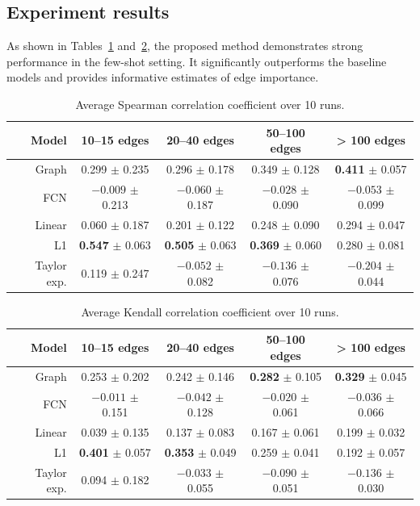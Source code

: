 \subsection{Experiment results}

As shown in Tables~\ref{results_spearman} and~\ref{results_kendall}, the proposed method demonstrates strong performance in the few-shot setting. 
It significantly outperforms the baseline models and provides informative estimates of edge importance.

\begin{table}[H]
\caption{Average Spearman correlation coefficient over 10 runs.}
\label{results_spearman}
\centering
\begin{tabular}{|r|c|c|c|c|}
\hline
\bfseries Model & 10--15 edges & 20--40 edges & 50--100 edges & > 100 edges \\
\hline
Graph  & 0.299 $\pm$ 0.235 & 0.296 $\pm$ 0.178 & 0.349 $\pm$ 0.128 & \textbf{0.411} $\pm$ 0.057 \\
FCN & $-0.009$ $\pm$ 0.213 & $-0.060$ $\pm$ 0.187 & $-0.028$ $\pm$ 0.090 & $-0.053$ $\pm$ 0.099 \\
Linear & 0.060 $\pm$ 0.187 & 0.201 $\pm$ 0.122 & 0.248 $\pm$ 0.090 & 0.294 $\pm$ 0.047 \\
L1 & \textbf{0.547} $\pm$ 0.063 & \textbf{0.505} $\pm$ 0.063 & \textbf{0.369} $\pm$ 0.060 & 0.280 $\pm$ 0.081 \\
Taylor exp.& 0.119 $\pm$ 0.247 & $-0.052$ $\pm$ 0.082 & $-0.136$ $\pm$ 0.076 & $-0.204$ $\pm$ 0.044 \\
\hline
\end{tabular}
\end{table}

\begin{table}[H]
\caption{Average Kendall correlation coefficient over 10 runs.}
\label{results_kendall}
\centering
\begin{tabular}{|r|c|c|c|c|}
\hline
\bfseries Model & 10--15 edges & 20--40 edges & 50--100 edges & > 100 edges \\
\hline
Graph  & 0.253 $\pm$ 0.202 & 0.242 $\pm$ 0.146 & \textbf{0.282} $\pm$ 0.105 & \textbf{0.329} $\pm$ 0.045 \\
FCN & $-0.011$ $\pm$ 0.151 & $-0.042$ $\pm$ 0.128 & $-0.020$ $\pm$ 0.061 & $-0.036$ $\pm$ 0.066 \\
Linear & 0.039 $\pm$ 0.135 & 0.137 $\pm$ 0.083 & 0.167 $\pm$ 0.061 & 0.199 $\pm$ 0.032 \\
L1 & \textbf{0.401} $\pm$ 0.057 & \textbf{0.353} $\pm$ 0.049 & 0.259 $\pm$ 0.041 & 0.192 $\pm$ 0.057 \\
Taylor exp. & 0.094 $\pm$ 0.182 & $-0.033$ $\pm$ 0.055 & $-0.090$ $\pm$ 0.051 & $-0.136$ $\pm$ 0.030 \\
\hline
\end{tabular}
\end{table}


